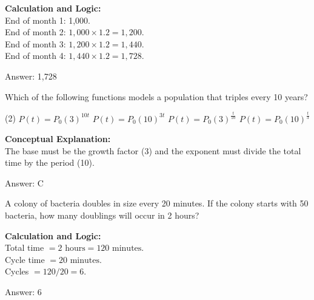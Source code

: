 \documentclass[11pt,paper=a4,answers]{exam}
\begin{document}
\begin{questions}
\begin{solution}
\textbf{Calculation and Logic:} \\
End of month 1: 1,000. \\
End of month 2: $1,000 \times 1.2 = 1,200$. \\
End of month 3: $1,200 \times 1.2 = 1,440$. \\
End of month 4: $1,440 \times 1.2 = 1,728$.

\vspace{25pt}

Answer: \colorbox{yellow!100}{1,728}
\end{solution}

\vspace{40pt}

\question
Which of the following functions models a population that triples every 10 years?
\begin{tasks}(2)
    \task $P(t) = P_0 (3)^{10t}$
    \task $P(t) = P_0 (10)^{3t}$
    \task $P(t) = P_0 (3)^{\frac{t}{10}}$
    \task $P(t) = P_0 (10)^{\frac{t}{3}}$
\end{tasks}

\begin{solution}
\textbf{Conceptual Explanation:} \\
The base must be the growth factor (3) and the exponent must divide the total time by the period (10).

\vspace{25pt}

Answer: \colorbox{yellow!100}{C}
\end{solution}

\vspace{40pt}

\question
A colony of bacteria doubles in size every 20 minutes. If the colony starts with 50 bacteria, how many doublings will occur in 2 hours?

\begin{solution}
\textbf{Calculation and Logic:} \\
Total time $= 2 \text{ hours} = 120 \text{ minutes}$. \\
Cycle time $= 20 \text{ minutes}$. \\
Cycles $= 120 / 20 = 6$.

\vspace{25pt}

Answer: \colorbox{yellow!100}{6}
\end{solution}


\end{questions}
\end{document}
